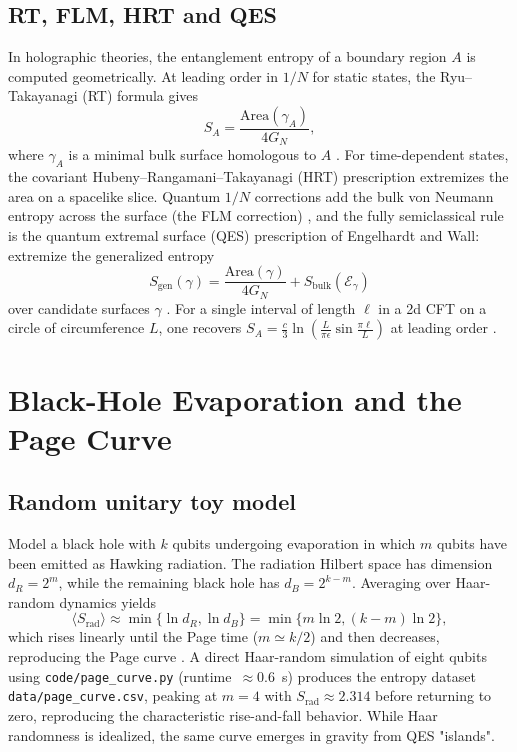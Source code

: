 \documentclass[12pt, numbers, sort&compress]{article}
\begin{document}
\subsection{RT, FLM, HRT and QES}
In holographic theories, the entanglement entropy of a boundary region $A$ is computed geometrically. At leading order in $1/N$ for static states, the Ryu–Takayanagi (RT) formula gives
\begin{equation}
S_A = \frac{\mathrm{Area}(\gamma_A)}{4G_N},
\end{equation}
where $\gamma_A$ is a minimal bulk surface homologous to $A$ \cite{Ryu:2006prl}. For time-dependent states, the covariant Hubeny–Rangamani–Takayanagi (HRT) prescription extremizes the area on a spacelike slice. Quantum $1/N$ corrections add the bulk von Neumann entropy across the surface (the FLM correction) \cite{Faulkner:2013FLM}, and the fully semiclassical rule is the quantum extremal surface (QES) prescription of Engelhardt and Wall: extremize the generalized entropy
\begin{equation}
S_{\text{gen}}(\gamma) = \frac{\mathrm{Area}(\gamma)}{4G_N} + S_{\text{bulk}}(\mathcal{E}_\gamma)
\label{QES}
\end{equation}
over candidate surfaces $\gamma$ \cite{EngelhardtWall:2015QES}. For a single interval of length $\ell$ in a 2d CFT on a circle of circumference $L$, one recovers $S_A = \frac{c}{3}\ln\left(\frac{L}{\pi\epsilon}\sin\frac{\pi\ell}{L}\right)$ at leading order \cite{Ryu:2006prl}.

\section{Black-Hole Evaporation and the Page Curve}

\subsection{Random unitary toy model}
Model a black hole with $k$ qubits undergoing evaporation in which $m$ qubits have been emitted as Hawking radiation. The radiation Hilbert space has dimension $d_R=2^m$, while the remaining black hole has $d_B=2^{k-m}$. Averaging over Haar-random dynamics yields
\begin{equation}
\langle S_{\text{rad}}\rangle \approx \min\{\ln d_R, \ln d_B\} = \min\{m\ln 2, (k-m)\ln 2\},
\end{equation}
which rises linearly until the Page time ($m\simeq k/2$) and then decreases, reproducing the Page curve \cite{Page:1993prl}. A direct Haar-random simulation of eight qubits using \texttt{code/page\_curve.py} (runtime~\(\approx0.6\)~s) produces the entropy dataset \texttt{data/page\_curve.csv}, peaking at $m=4$ with $S_{\text{rad}}\approx2.314$ before returning to zero, reproducing the characteristic rise-and-fall behavior. While Haar randomness is idealized, the same curve emerges in gravity from QES "islands".
\end{document}
